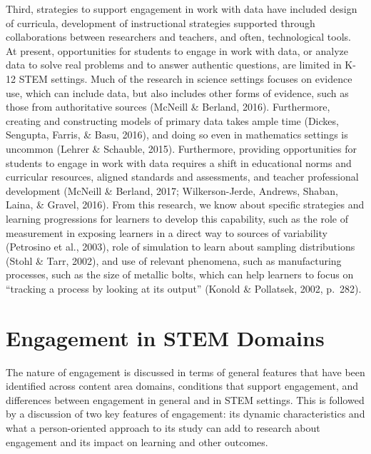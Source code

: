 \documentclass[]{msu-thesis}
\theoremstyle{definition}
\theoremstyle{definition}
\theoremstyle{definition}
\theoremstyle{remark}
\begin{document}
Third, strategies to support engagement in work with data have included
design of curricula, development of instructional strategies supported
through collaborations between researchers and teachers, and often,
technological tools. At present, opportunities for students to engage in
work with data, or analyze data to solve real problems and to answer
authentic questions, are limited in K-12 STEM settings. Much of the
research in science settings focuses on evidence use, which can include
data, but also includes other forms of evidence, such as those from
authoritative sources (McNeill \& Berland, 2016). Furthermore, creating
and constructing models of primary data takes ample time (Dickes,
Sengupta, Farris, \& Basu, 2016), and doing so even in mathematics
settings is uncommon (Lehrer \& Schauble, 2015). Furthermore, providing
opportunities for students to engage in work with data requires a shift
in educational norms and curricular resources, aligned standards and
assessments, and teacher professional development (McNeill \& Berland,
2017; Wilkerson-Jerde, Andrews, Shaban, Laina, \& Gravel, 2016). From
this research, we know about specific strategies and learning
progressions for learners to develop this capability, such as the role
of measurement in exposing learners in a direct way to sources of
variability (Petrosino et al., 2003), role of simulation to learn about
sampling distributions (Stohl \& Tarr, 2002), and use of relevant
phenomena, such as manufacturing processes, such as the size of metallic
bolts, which can help learners to focus on ``tracking a process by
looking at its output'' (Konold \& Pollatsek, 2002, p.~282).

\section{Engagement in STEM Domains}\label{engagement-in-stem-domains}

The nature of engagement is discussed in terms of general features that
have been identified across content area domains, conditions that
support engagement, and differences between engagement in general and in
STEM settings. This is followed by a discussion of two key features of
engagement: its dynamic characteristics and what a person-oriented
approach to its study can add to research about engagement and its
impact on learning and other outcomes.
\end{document}
